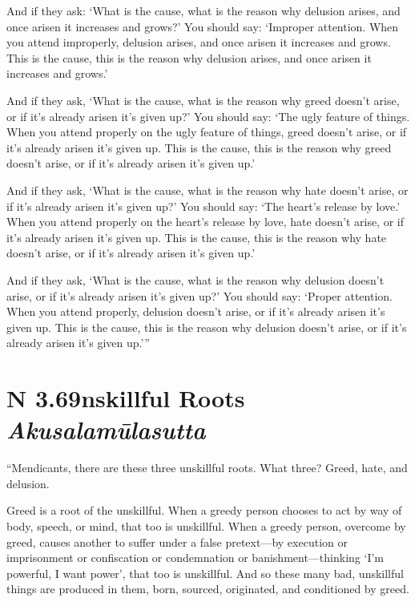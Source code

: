 \documentclass[12pt,openany]{book}%
\newcommand*{\suttatitleacronym}[1]{\smaller[2]{#1}\vspace*{.3em}}
\newcommand*{\suttatitletranslation}[1]{\linebreak{#1}}
\newcommand*{\suttatitleroot}[1]{\linebreak\smaller[2]\itshape{#1}}
\newcommand*{\tocacronym}[1]{\hspace*{-3.3em}{#1}\quad}
\newcommand*{\toctranslation}[1]{#1}
\newcommand*{\tocroot}[1]{(\textit{#1})}
\begin{document}
And if they ask: ‘What is the cause, what is the reason why delusion arises, and once arisen it increases and grows?’ You should say: ‘Improper attention. When you attend improperly, delusion arises, and once arisen it increases and grows. This is the cause, this is the reason why delusion arises, and once arisen it increases and grows.’ 

And if they ask, ‘What is the cause, what is the reason why greed doesn’t arise, or if it’s already arisen it’s given up?’ You should say: ‘The ugly feature of things. When you attend properly on the ugly feature of things, greed doesn’t arise, or if it’s already arisen it’s given up. This is the cause, this is the reason why greed doesn’t arise, or if it’s already arisen it’s given up.’ 

And if they ask, ‘What is the cause, what is the reason why hate doesn’t arise, or if it’s already arisen it’s given up?’ You should say: ‘The heart’s release by love.’ When you attend properly on the heart’s release by love, hate doesn’t arise, or if it’s already arisen it’s given up. This is the cause, this is the reason why hate doesn’t arise, or if it’s already arisen it’s given up.’ 

And if they ask, ‘What is the cause, what is the reason why delusion doesn’t arise, or if it’s already arisen it’s given up?’ You should say: ‘Proper attention. When you attend properly, delusion doesn’t arise, or if it’s already arisen it’s given up. This is the cause, this is the reason why delusion doesn’t arise, or if it’s already arisen it’s given up.’” 

%
\section*{{\suttatitleacronym AN 3.69}{\suttatitletranslation Unskillful Roots }{\suttatitleroot Akusalamūlasutta}}
\addcontentsline{toc}{section}{\tocacronym{AN 3.69} \toctranslation{Unskillful Roots } \tocroot{Akusalamūlasutta}}

“Mendicants, there are these three unskillful roots. What three? Greed, hate, and delusion. 

Greed is a root of the unskillful. When a greedy person chooses to act by way of body, speech, or mind, that too is unskillful. When a greedy person, overcome by greed, causes another to suffer under a false pretext—by execution or imprisonment or confiscation or condemnation or banishment—thinking ‘I’m powerful, I want power’, that too is unskillful. And so these many bad, unskillful things are produced in them, born, sourced, originated, and conditioned by greed. 
\end{document}
